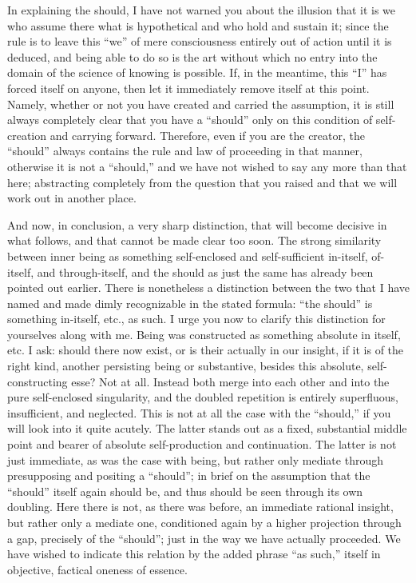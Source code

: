In explaining the should, I have not warned you
about the illusion that it is we who assume there
what is hypothetical and who hold and sustain it;
since the rule is to leave this “we”
of mere consciousness entirely out of action until it is deduced,
and being able to do so is the art without which
no entry into the domain of the science of knowing is possible.
If, in the meantime, this “I” has forced itself on anyone,
then let it immediately remove itself at this point.
Namely, whether or not you have created and carried the assumption,
it is still always completely clear that you have a “should”
only on this condition of self-creation and carrying forward.
Therefore, even if you are the creator,
the “should” always contains the rule and law
of proceeding in that manner,
otherwise it is not a “should,”
and we have not wished to say any more than that here;
abstracting completely from the question that you raised
and that we will work out in another place.

And now, in conclusion, a very sharp distinction,
that will become decisive in what follows,
and that cannot be made clear too soon.
The strong similarity between inner being
as something self-enclosed and self-sufficient
in-itself, of-itself, and through-itself,
and the should as just the same
has already been pointed out earlier.
There is nonetheless a distinction
between the two that I have named
and made dimly recognizable in the stated formula:
“the should” is something in-itself, etc., as such.
I urge you now to clarify this distinction
for yourselves along with me.
Being was constructed as something absolute in itself, etc.
I ask: should there now exist,
or is their actually in our insight,
if it is of the right kind,
another persisting being or substantive,
besides this absolute, self-constructing esse?
Not at all.
Instead both merge into each other
and into the pure self-enclosed singularity,
and the doubled repetition is entirely
superfluous, insufficient, and neglected.
This is not at all the case with the “should,”
if you will look into it quite acutely.
The latter stands out as a fixed, substantial
middle point and bearer of
absolute self-production and continuation.
The latter is not just immediate,
as was the case with being,
but rather only mediate through
presupposing and positing a “should”;
in brief on the assumption that
the “should” itself again should be,
and thus should be seen through its own doubling.
Here there is not, as there was before,
an immediate rational insight,
but rather only a mediate one,
conditioned again by a higher
projection through a gap,
precisely of the “should”;
just in the way we have actually proceeded.
We have wished to indicate this relation
by the added phrase “as such,”
itself in objective, factical oneness of essence.

